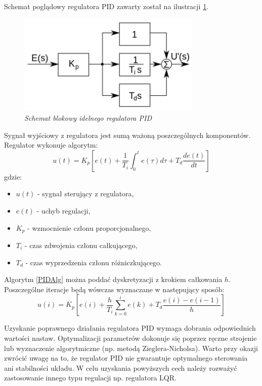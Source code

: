 \documentclass[12pt, oneside]{report}
\theoremstyle{definition}
\begin{document}
Schemat poglądowy regulatora PID zawarty został na ilustracji \ref{PID}.

\begin{figure}[H]
	\centering
		\includegraphics[width = 250pt]{PID} 
		\caption{\textit{Schemat blokowy idelnego regulatora PID \cite{PID}}}
		\label{PID}
\end{figure}

Sygnał wyjściowy z regulatora jest sumą ważoną poszczególnych komponentów. Regulator wykonuje algorytm:
\begin{equation} \label{PIDAlg}
u(t) = K_p[e(t) + \frac{1}{T_i}\int_{0}^{t} e(\tau) d\tau + T_d \frac{de(t)}{dt}]
\end{equation}
gdzie:
\begin{itemize}
\item $u(t)$ - sygnał sterujący z regulatora,
\item $e(t)$ - uchyb regulacji,
\item $K_p$ - wzmocnienie członu proporcjonalnego,
\item $T_i$ - czas zdwojenia członu całkującego,
\item $T_d$ - czas wyprzedzenia członu różniczkującego.
\end{itemize}

Algorytm \ref{PIDAlg} można poddać dyskretyzacji z krokiem całkowania $h$. Poszczególne iteracje będą wówczas wyznaczane w następujący sposób:
\begin{equation}
u(i) = K_p[e(i) + \frac{h}{T_i} \sum_{k=0}^{i} e(k) + T_d \frac{e(i) - e(i-1)}{h}]
\end{equation}

Uzyskanie poprawnego działania regulatora PID wymaga dobrania odpowiednich wartości nastaw. Optymalizacji parametrów dokonuje się poprzez ręczne strojenie lub wyznaczenie algorytmiczne (np. metodą Zieglera-Nicholsa). Warto przy okazji zwrócić uwagę na to, że regulator PID nie gwarantuje optymalnego sterowania ani stabilności układu. W celu uzyskania powyższych cech należy rozważyć zastosowanie innego typu regulacji np. regulatora LQR.
\end{document}

